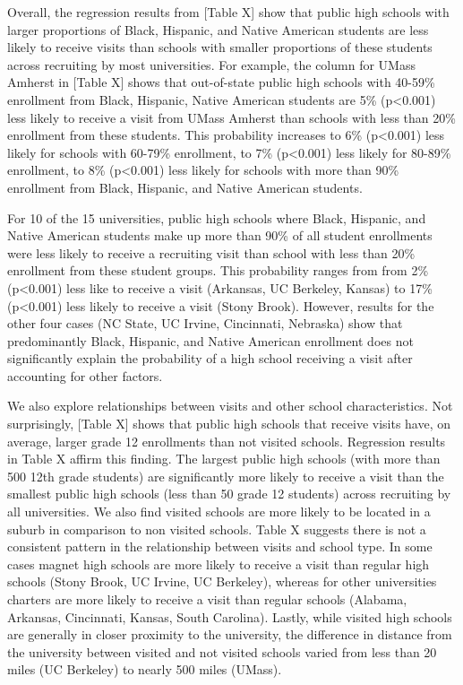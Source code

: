 \documentclass[twoside]{article}
\begin{document}
Overall, the regression results from [Table X] show that public high schools with larger proportions of Black, Hispanic, and Native American students are less likely to receive visits than schools with smaller proportions of these students across recruiting by most universities. For example, the column for UMass Amherst in [Table X] shows that out-of-state public high schools with 40-59\% enrollment from Black, Hispanic, Native American students are 5\% (p<0.001) less likely to receive a visit from UMass Amherst than schools with less than 20\% enrollment from these students. This probability increases to 6\% (p<0.001) less likely for schools with 60-79\% enrollment, to 7\% (p<0.001) less likely for 80-89\% enrollment, to 8\% (p<0.001) less likely for schools with more than 90\% enrollment from Black, Hispanic, and Native American students. 

For 10 of the 15 universities, public high schools where Black, Hispanic, and Native American students make up more than 90\% of all student enrollments were less likely to receive a recruiting visit than school with less than 20\% enrollment from these student groups. This probability ranges from from 2\% (p<0.001) less like to receive a visit (Arkansas, UC Berkeley, Kansas)  to 17\% (p<0.001) less likely to receive a visit (Stony Brook). However, results for the other four cases (NC State, UC Irvine, Cincinnati, Nebraska) show that predominantly Black, Hispanic, and Native American enrollment does not significantly explain the probability of a high school receiving a visit after accounting for other factors. 

We also explore relationships between visits and other school characteristics. Not surprisingly, [Table X] shows that public high schools that receive visits have, on average, larger grade 12 enrollments than not visited schools. Regression results in Table X affirm this finding. The largest public high schools (with more than 500 12th grade students) are significantly more likely to receive a visit than the smallest public high schools (less than 50 grade 12 students) across recruiting by all universities.  We also find visited schools are more likely to be located in a suburb in comparison to non visited schools. Table X suggests there is not a consistent pattern in the relationship between visits and school type. In some cases magnet high schools are more likely to receive a visit than regular high schools (Stony Brook, UC Irvine, UC Berkeley), whereas for other universities charters are more likely to receive a visit than regular schools (Alabama, Arkansas, Cincinnati, Kansas, South Carolina). Lastly, while visited high schools are generally in closer proximity to the university, the difference in distance from the university between visited and not visited schools varied from less than 20 miles (UC Berkeley) to nearly 500 miles (UMass). 
\end{document}
